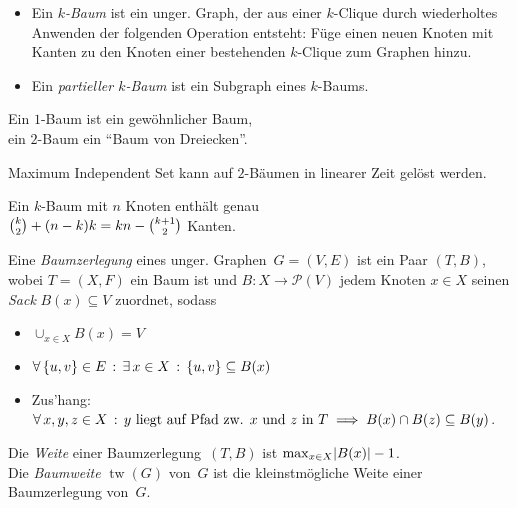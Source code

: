 \documentclass{cheat-sheet}
\newcommand{\size}[1]{\abs{#1}} %
\newcommand{\Powerset}{\mathcal{P}} %
\DeclareMathOperator{\treewidth}{tw} %
\begin{document}
\begin{defn}
  \begin{itemize}
    \item
      Ein \emph{$k$-Baum} ist ein unger. Graph, der aus einer $k$-Clique durch wiederholtes Anwenden der folgenden Operation entsteht:
      Füge einen neuen Knoten mit Kanten zu den Knoten einer bestehenden $k$-Clique zum Graphen hinzu.
    \item Ein \emph{partieller $k$-Baum} ist ein Subgraph eines $k$-Baums.
  \end{itemize}
\end{defn}

\begin{bspe}
  \begin{minipage}[t]{0.8 \linewidth}
    Ein $1$-Baum ist ein gewöhnlicher Baum, \\
    ein $2$-Baum ein "`Baum von Dreiecken"'.
  \end{minipage}
\end{bspe}

\begin{lem}
  Maximum Independent Set kann auf $2$-Bäumen in linearer Zeit gelöst werden.
\end{lem}

\begin{lem}
  \begin{minipage}[t]{0.8 \linewidth}
    Ein $k$-Baum mit $n$ Knoten enthält genau \\
    $\tbinom{k}{2} + (n-k) k = k n - \tbinom{k+1}{2}$ Kanten.
  \end{minipage}
\end{lem}

\begin{defn}
  Eine \emph{Baumzerlegung} eines unger. Graphen~$G = (V, E)$ ist ein Paar $(T, B)$, wobei $T = (X, F)$ ein Baum ist und $B : X \to \Powerset(V)$ jedem Knoten $x \in X$ seinen \textit{Sack} $B(x) \subseteq V$ zuordnet, sodass
  \begin{itemize}
    \item $\cup_{x \in X} B(x) = V$
    \item $\forall \, {\{ u, v \} \in E} \,:\, \exists \, {x \in X} \,:\, \{ u, v \} \subseteq B(x)$
    \item Zus'hang: $\forall \, {x, y, z \in X} \,:\, \text{$y$ liegt auf Pfad zw. $x$ und~$z$ in~$T$} \implies B(x) \cap B(z) \subseteq B(y)$.
  \end{itemize}
  Die \emph{Weite} einer Baumzerlegung~$(T, B)$ ist ${\max}_{x \in X} \size{B(x)} - 1$. \\
  Die \emph{Baumweite} $\treewidth(G)$ von~$G$ ist die kleinstmögliche Weite einer Baumzerlegung von~$G$.
\end{defn}
\end{document}
